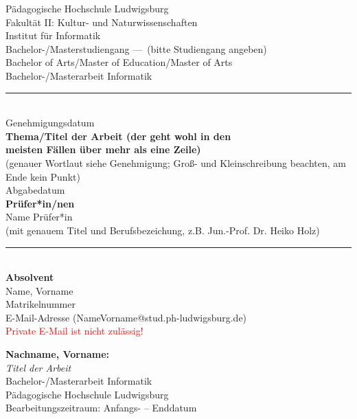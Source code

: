 \documentclass[oneside,12pt,a4paper]{scrreprt} %
\begin{document}
\begin{titlepage}
\begin{center}
\LARGE Pädagogische Hochschule Ludwigsburg \\
\large Fakultät II: Kultur- und Naturwissenschaften \\
Institut für Informatik\\
[1cm]

\Large Bachelor-/Masterstudiengang ---~\small{(bitte Studiengang angeben)}
\\
\Large Bachelor of Arts/Master of Education/Master of Arts
\\[1cm]
\huge Bachelor-/Masterarbeit Informatik
\large\\[0.75cm]
\rule{0.5\textwidth}{1pt}
\\[0.75cm]
\large
Genehmigungsdatum
\\[0.5cm]
\Large\textbf{Thema/Titel der Arbeit (der geht wohl in den\\ meisten Fällen über mehr als eine Zeile)}
\\\small\textrm(genauer Wortlaut siehe Genehmigung; Groß- und Kleinschreibung beachten, am Ende kein Punkt)\\
[0.5cm]
\large
Abgabedatum
\\[1cm]
\small
\textbf{Prüfer*in/nen}\\[0.3cm] 
\large Name Prüfer*in 
\\\small (mit genauem Titel und Berufsbezeichung, z.B. Jun.-Prof. Dr. Heiko Holz)
\\[.75cm]
\rule{0.5\textwidth}{1pt}
\\[0.7  5cm]
\small
\textbf{Absolvent}\\[0.3cm]
\large Name, Vorname\\
Matrikelnummer\\
E-Mail-Adresse \small(NameVorname@stud.ph-ludwigsburg.de)\\\textcolor{red}{Private E-Mail ist nicht zulässig!}
\vfill
{}

\end{center}
\end{titlepage}

\thispagestyle{empty}
\vspace*{\fill}
\textbf{Nachname, Vorname:}\\
\emph{Titel der Arbeit}\\
Bachelor-/Masterarbeit Informatik\\
Pädagogische Hochschule Ludwigsburg\\
Bearbeitungszeitraum: Anfangs- -- Enddatum
\newpage
\end{document}
